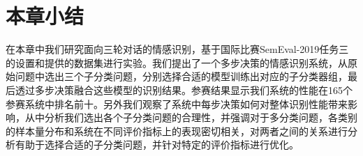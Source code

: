 \section{本章小结}

在本章中我们研究面向三轮对话的情感识别，基于国际比赛SemEval-2019任务三的设置和提供的数据集进行实验。我们提出了一个多步决策的情感识别系统，从原始问题中选出三个子分类问题，分别选择合适的模型训练出对应的子分类器组，最后透过多步决策融合这些模型的识别结果。参赛结果显示我们系统的性能在165个参赛系统中排名前十。另外我们观察了系统中每步决策如何对整体识别性能带来影响，从中分析我们选出各个子分类问题的合理性，并强调对于多分类问题，各类别的样本量分布和系统在不同评价指标上的表现密切相关，对两者之间的关系进行分析有助于选择合适的子分类问题，并针对特定的评价指标进行优化。

